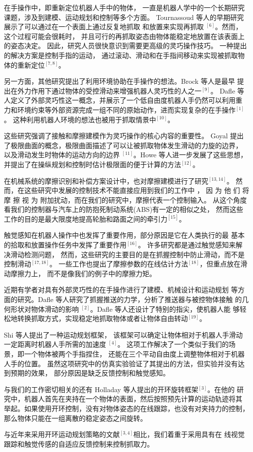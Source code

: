 在手操作中，即重新定位机器人手中的物体，
一直是机器人学中的一个长期研究课题，涉及到建模、运动规划和控制等多个方面。
Tournassoud 等人的早期研究展示了可以通过在一个表面上通过反复地抓取
和放置来实现再抓取 $^{[6]}$。然而，这个过程可能会很耗时，
并且可行的再抓取姿态由物体能稳定地放置在该表面上的姿态决定。
因此，研究人员很快意识到需要更高级的灵巧操作技巧。
一种提出的解决方案是控制手指的运动，
通过滚动、滑动和在手指间移动来实现被抓取物体的重新定位$^{[7, 8]}$。

另一方面，其他研究提出了利用环境协助在手操作的想法。Brock 等人是最早
提出在外力作用下通过物体的受控滑动来增强机器人灵巧性的人之一$^{[9]}$。 Dafle 等
人定义了外部灵巧性这一概念，并展示了一个低自由度机器人手仍然可以利用重
力和环境约束等外部资源完成一组不同的原始动作，进而实现复杂的在手操作$^{[1]}$。
这种利用机器人环境的想法也被用于抓取情景中$^{[10]}$。

这些研究强调了接触和摩擦建模作为灵巧操作的核心内容的重要性。 
Goyal 提出了极限曲面的概念，极限曲面描述了可以让被抓取物体发生滑动的力旋的边界，
以及滑动发生时物体的运动方向的边界 $^{[11]}$。Howe 等人进一步发展了这些思想，
并提出了在操纵规划和控制时估计极限面的便于计算的方法$^{[12]}$。

在机械系统的摩擦识别和补偿方案设计中，也对摩擦建模进行了研究$^{[13, 14]}$。
然而，在这些研究中发展的控制技术不能直接应用到我们的工作中 ，
因 为 他 们 将 摩 擦 视 为 附加扰动，而在我们的研究中，摩擦代表一个控制输入。
从这个角度看我们的控制器与汽车上的防抱死制动系统(ABS)有一定的相似之处，
然而这些工作的目的是最大限度地提高轮胎和路面之间的牵引力$^{[15]}$。

触觉感知在机器人操作中也发挥了重要作用，部分原因是它在人类执行的最
基本的拾取和放置操作任务中发挥了重要作用$^{[16]}$。
许多研究都是通过触觉感知来解决滑动检测问题，
然而，这些研究的主要目的是在抓握控制中防止滑动，而不是控制滑动$^{[17, 18]}$。
一些工作也提出了摩擦参数的在线估计方法$^{[18]}$，但重点放在滑动摩擦力上，
而不是像我们的例子中的摩擦力矩。

近期有学者对具有外部灵巧性的在手操作进行了建模、机械设计和运动规划
等方面的研究。Dafle 等人研究了抓握推送的力学，分析了推送器与被控物体接触
的几何形状对物体滑动的影响 $^{[2]}$。Dafle 等人还设计了特别的指尖，使机器人能
够轻松地转换抓取方式，实现稳定地抓取物体或者让物体自由转动$^{[19]}$。

Shi 等人提出了一种运动规划框架，
该框架可以确定让物体相对于机器人手滑动一定距离时机器人手所需的加速度 $^{[4]}$。
这项工作解决了一个类似于我们的场景，即一个物体被两个手指捏住，
还能在三个平动自由度上调整物体相对于机器人手的位置。
虽然这项研究中的仿真实验验证了其提出的方法，但实验并没有达到预期的效果，
部分原因是缺乏反馈控制和触觉感知。

与我们的工作密切相关的还有 Holladay 等人提出的开环旋转框架$^{[3]}$。在他的
研究中，机器人首先在夹持在一个物体的表面，然后按照预先计算的运动轨迹将其
举起。如果使用开环控制，没有对物体姿态的在线跟踪，也没有对夹持力的控制，
那么物体只能在一组离散的稳定姿态之间旋转。

与近年来采用开环运动规划策略的文献$^{[3,4]}$相比，我们着重于采用具有在
线视觉跟踪和触觉传感的自适应反馈控制来控制抓取力。

